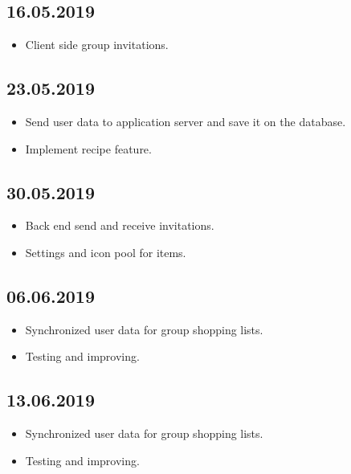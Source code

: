 \documentclass[12pt]{article}
\theoremstyle{definition}
\begin{document}
\subsection{16.05.2019}
\begin{itemize}
\item Client side group invitations.
\end{itemize}
\subsection{23.05.2019}
\begin{itemize}
\item Send user data to application server and save it on the database.
\item Implement recipe feature.
\end{itemize}
\subsection{30.05.2019}
\begin{itemize}
\item Back end send and receive invitations.
\item Settings and icon pool for items.
\end{itemize}
\subsection{06.06.2019}
\begin{itemize}
\item Synchronized user data for group shopping lists.
\item Testing and improving.
\end{itemize}
\subsection{13.06.2019}
\begin{itemize}
\item Synchronized user data for group shopping lists.
\item Testing and improving.
\end{itemize}
\end{document}
